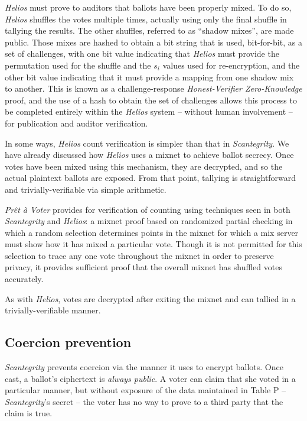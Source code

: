 \documentclass[10pt,twocolumn]{article}
\newcommand{\term}[1]{\textit{#1}}
\newcommand{\preta}{Pr\^{e}t \`{a}}
\newcommand{\pv}{\preta{} Voter}
\begin{document}
\term{Helios} must prove to auditors that ballots have been properly mixed. To do so, \term{Helios}
shuffles the votes multiple times, actually using only the final shuffle in tallying the results.
The other shuffles, referred to as ``shadow mixes'', are made public. Those mixes are hashed to
obtain a bit string that is used, bit-for-bit, as a set of challenges, with one bit value indicating
that \term{Helios} must provide the permutation used for the shuffle and the $s_{i}$ values used for
re-encryption, and the other bit value indicating that it must provide a mapping from one shadow mix
to another. This is known as a challenge-response \term{Honest-Verifier Zero-Knowledge} proof, and the
use of a hash to obtain the set of challenges allows this process to be completed entirely within
the \term{Helios} system -- without human involvement -- for publication and auditor verification.

In some ways, \term{Helios} count verification is simpler than that in \term{Scantegrity}. We have already
discussed how \term{Helios} uses a mixnet to achieve ballot secrecy. Once votes have been mixed using this
mechanism, they are decrypted, and so the actual plaintext ballots are exposed. From that point,
tallying is straightforward and trivially-verifiable via simple arithmetic.

\term{\pv{}} provides for verification of counting using techniques seen in both \term{Scantegrity}
and \term{Helios}: a mixnet proof based on randomized partial checking in which a random selection
determines points in the mixnet for which a mix server must show how it has mixed a particular vote.
Though it is not permitted for this selection to trace any one vote throughout the mixnet in order
to preserve privacy, it provides sufficient proof that the overall mixnet has shuffled votes
accurately.

As with \term{Helios}, votes are decrypted after exiting the mixnet and can tallied in a
trivially-verifiable manner.

\subsection{Coercion prevention}

\term{Scantegrity} prevents coercion via the manner it uses to encrypt ballots. Once cast, a ballot's
ciphertext is \emph{always public}. A voter can claim that she voted in a particular manner, but
without exposure of the data maintained in Table P -- \term{Scantegrity}'s secret -- the voter has no
way to prove to a third party that the claim is true.
\end{document}
